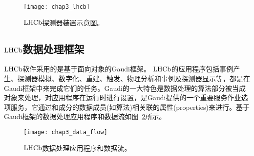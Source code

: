 \begin{figure}
\begin{center}
\texttt{[image: chap3\_lhcb]}
\caption{$\mbox{LHCb}$探测器装置示意图。}
\label{fig:detector}
\end{center}
\end{figure}

\subsection{$\mbox{LHCb}$数据处理框架}
$\mbox{LHCb}$软件采用的是基于面向对象的Gaudi框架。
$\mbox{LHCb}$的应用程序包括事例产生、探测器模拟、数字化、重建、触发、物理分析和事例及探测器显示等，都是在Gaudi框架中来完成它们的任务。Gaudi的一大特色是数据处理的算法部分被当成对象来处理，对应用程序在运行时进行设置，是Gaudi提供的一个重要服务作业选项服务，它通过和成分的数据成员(如算法)相关联的属性(properties)来进行。基于Gaudi框架的数据处理应用程序和数据流如图~\ref{fig:data_program}所示。
 \begin{figure}
 \begin{center}
 \texttt{[image: chap3\_data\_flow]}
\caption{ $\mbox{LHCb}$数据处理应用程序和数据流。}
\label{fig:data_program}
 \end{center}
\end{figure}
